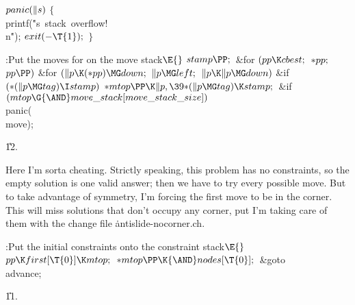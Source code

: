 \B\D$\\{panic}(\|s)$ \6
${}\{{}$\1\6
\\{printf}(\.{"s\ stack\ overflow!\\n}\)\.{"});\6
${}\\{exit}({-}\T{1});{}$\6
\4${}\}{}$\2\par
\Y\B\4:Put the moves for  on the move stack\X${}\E{}$\6
$\\{stamp}\PP;{}$\6
\&{for} ${}(\\{pp}\K\\{cbest};{}$ ${}{*}\\{pp};{}$ ${}\\{pp}\PP){}$\1\6
\&{for} ${}(\|p\K({*}\\{pp})\MG\\{down};{}$ ${}\|p\MG\\{left};{}$ ${}\|p\K\|p%
\MG\\{down}){}$\1\6
\&{if} ${}({*}(\|p\MG\\{tag})\I\\{stamp}){}$\1\5
${}{*}\\{mtop}\PP\K\|p,\39{*}(\|p\MG\\{tag})\K\\{stamp};{}$\2\2\2\6
\&{if} ${}(\\{mtop}\G{\AND}\\{move\_stack}[\\{move\_stack\_size}]){}$\1\5
\\{panic}(\\{move});\2\par
\U12.\fi

Here I'm sorta cheating. Strictly speaking, this problem
has no
constraints, so the empty solution is one valid answer; then we have
to try every possible move. But to take advantage of symmetry, I'm
forcing the first move to be in the corner. This will miss solutions
that don't occupy any corner, put I'm taking care of them with
the change file \.{antislide-nocorner.ch}.

\Y\B\4:Put the initial constraints onto the constraint stack\X${}\E{}$\6
$\\{pp}\K\\{first}[\T{0}]\K\\{mtop};{}$\6
${}{*}\\{mtop}\PP\K{\AND}\\{nodes}[\T{0}];{}$\6
\&{goto} \\{advance};\par
\U11.\fi

